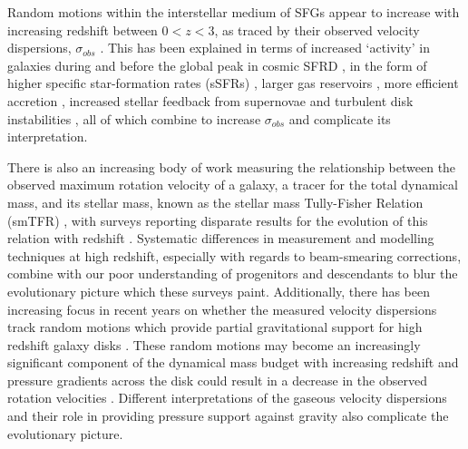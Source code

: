 \documentclass[fleqn,usenatbib]{mnras}
\begin{document}
Random motions within the interstellar medium of SFGs appear to increase with increasing redshift between $0 < z < 3$, as traced by their observed velocity dispersions, $\sigma_{obs}$ \citep{Genzel2008,ForsterSchreiber2009,Law2009,Cresci2009,Gnerucci2011,Epinat2012,Kassin2012,Green2014,Wisnioski2015,Stott2016}.
This has been explained in terms of increased `activity' in galaxies during and before the global peak in cosmic SFRD \citep{Madau_2014}, in the form of higher specific star-formation rates (sSFRs) \citep{Wisnioski2015}, larger gas reservoirs \citep{Law2009,ForsterSchreiber2009,Wisnioski2015,Stott2016}, more efficient accretion \citep{Law2009}, increased stellar feedback from supernovae \citep{Kassin2012} and turbulent disk instabilities \citep{Law2009,Bournaud2007,Bournaud2016}, all of which combine to increase $\sigma_{obs}$ and complicate its interpretation.

There is also an increasing body of work measuring the relationship between the observed maximum rotation velocity of a galaxy, a tracer for the total dynamical mass, and its stellar mass, known as the stellar mass Tully-Fisher Relation (smTFR) \citep{Tully1977}, with surveys reporting disparate results for the evolution of this relation with redshift \citep[e.g.][]{Puech2008,Miller2011,Gnerucci2011,Swinbank2012,Simons2016,Tiley2016,Harrison2017,Straatman2017,Ubler2017}.
Systematic differences in measurement and modelling techniques at high redshift, especially with regards to beam-smearing corrections, combine with our poor understanding of progenitors and descendants to blur the evolutionary picture which these surveys paint.
Additionally, there has been increasing focus in recent years on whether the measured velocity dispersions track random motions which provide partial gravitational support for high redshift galaxy disks \citep[e.g.][]{Burkert2010,Wuyts2016b,Ubler2017,Genzel2017,Lang2017}.
These random motions may become an increasingly significant component of the dynamical mass budget with increasing redshift \citep{Wuyts2016b} and pressure gradients across the disk could result in a decrease in the observed rotation velocities \citep{Burkert2010}. 
Different interpretations of the gaseous velocity dispersions and their role in providing pressure support against gravity also complicate the evolutionary picture. \\
\end{document}
